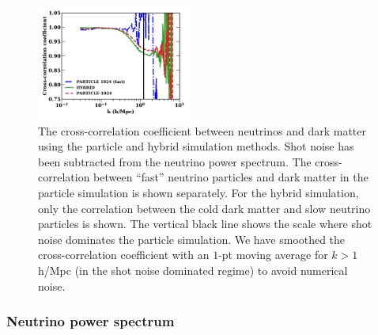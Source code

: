 \documentclass[useAMS, usenatbib]{mnras}
\begin{document}
\begin{figure}
\includegraphics[width=0.45\textwidth]{nuplots/corr_coeff-1.pdf}
  \caption{The cross-correlation coefficient between neutrinos and dark matter using the particle and hybrid simulation methods. Shot noise has been subtracted from the neutrino power spectrum. The cross-correlation between ``fast'' neutrino particles and dark matter in the particle simulation is shown separately. For the hybrid simulation, only the correlation between the cold dark matter and slow neutrino particles is shown. The vertical black line shows the scale where shot noise dominates the particle simulation.
  We have smoothed the cross-correlation coefficient with an $1$-pt moving average for $k > 1$ h/Mpc (in the shot noise dominated regime) to avoid numerical noise.
  }
  \label{fig:cross-corr}
\end{figure}


\subsubsection{Neutrino power spectrum}
\end{document}
